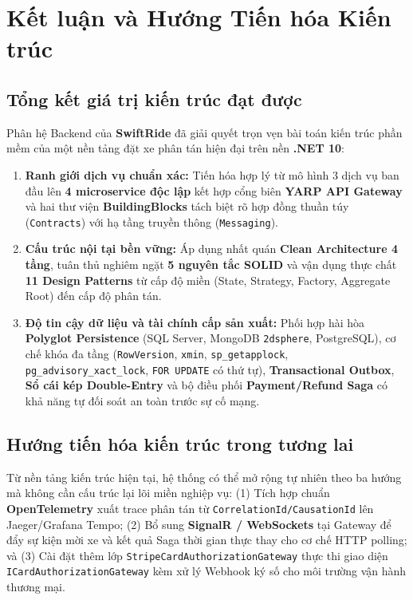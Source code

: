 \documentclass[12pt,a4paper]{article}
\begin{document}
\section{Kết luận và Hướng Tiến hóa Kiến trúc}

\subsection{Tổng kết giá trị kiến trúc đạt được}
Phân hệ Backend của \textbf{SwiftRide} đã giải quyết trọn vẹn bài toán kiến trúc phần mềm của một nền tảng đặt xe phân tán hiện đại trên nền \textbf{.NET 10}:
\begin{enumerate}[nosep]
    \item \textbf{Ranh giới dịch vụ chuẩn xác:} Tiến hóa hợp lý từ mô hình 3 dịch vụ ban đầu lên \textbf{4 microservice độc lập} kết hợp cổng biên \textbf{YARP API Gateway} và hai thư viện \textbf{BuildingBlocks} tách biệt rõ hợp đồng thuần túy (\texttt{Contracts}) với hạ tầng truyền thông (\texttt{Messaging}).
    \item \textbf{Cấu trúc nội tại bền vững:} Áp dụng nhất quán \textbf{Clean Architecture 4 tầng}, tuân thủ nghiêm ngặt \textbf{5 nguyên tắc SOLID} và vận dụng thực chất \textbf{11 Design Patterns} từ cấp độ miền (State, Strategy, Factory, Aggregate Root) đến cấp độ phân tán.
    \item \textbf{Độ tin cậy dữ liệu và tài chính cấp sản xuất:} Phối hợp hài hòa \textbf{Polyglot Persistence} (SQL Server, MongoDB \texttt{2dsphere}, PostgreSQL), cơ chế khóa đa tầng (\texttt{RowVersion}, \texttt{xmin}, \texttt{sp\_getapplock}, \texttt{pg\_advisory\_xact\_lock}, \texttt{FOR UPDATE} có thứ tự), \textbf{Transactional Outbox}, \textbf{Sổ cái kép Double-Entry} và bộ điều phối \textbf{Payment/Refund Saga} có khả năng tự đối soát an toàn trước sự cố mạng.
\end{enumerate}

\subsection{Hướng tiến hóa kiến trúc trong tương lai}
Từ nền tảng kiến trúc hiện tại, hệ thống có thể mở rộng tự nhiên theo ba hướng mà không cần cấu trúc lại lõi miền nghiệp vụ: (1) Tích hợp chuẩn \textbf{OpenTelemetry} xuất trace phân tán từ \texttt{CorrelationId/CausationId} lên Jaeger/Grafana Tempo; (2) Bổ sung \textbf{SignalR / WebSockets} tại Gateway để đẩy sự kiện mời xe và kết quả Saga thời gian thực thay cho cơ chế HTTP polling; và (3) Cài đặt thêm lớp \texttt{StripeCardAuthorizationGateway} thực thi giao diện \texttt{ICardAuthorizationGateway} kèm xử lý Webhook ký số cho môi trường vận hành thương mại.
\end{document}
